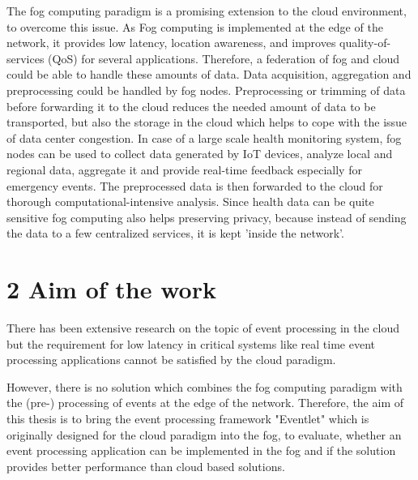 \documentclass[draft,final,openany,oneside]{vutinfth} %
\begin{document}
The fog computing paradigm is a promising extension to the cloud environment, to overcome this issue. As Fog computing is implemented at the edge of the network, it provides low latency, location awareness, and improves quality-of-services (QoS) for several applications. \cite{FogSecurityIssues}  \newline Therefore, a federation of fog and cloud could be able to handle these amounts of data. Data acquisition, aggregation and preprocessing could be handled by fog nodes. Preprocessing or trimming of data before forwarding it to the cloud reduces the needed amount of data to be transported, but also the storage in the cloud which helps to cope with the issue of data center congestion. \cite{FogComputingPrinciples} \newline
In case of a large scale health monitoring system, fog nodes can be used to collect data generated by IoT devices, analyze local and regional data, aggregate it and provide real-time feedback especially for emergency events. \newline
The preprocessed data is then forwarded to the cloud for thorough computational-intensive analysis. \cite{ASurveyOfFogComputing} Since health data can be quite sensitive fog computing also helps preserving privacy, because instead of sending the data to a few centralized services, it is kept 'inside the network'. \cite{FindingYourWay}   


\chapter{2  Aim of the work}

There has been extensive research on the topic of event processing in the cloud but the requirement for low latency in critical systems like real time event processing applications cannot be satisfied by the cloud paradigm. \cite{FogComputingPrinciples}

However,  there is no solution which combines the fog computing paradigm with the (pre-) processing of events at the edge of the network. 
Therefore, the aim of this thesis is to bring the event processing framework "Eventlet" \cite{Appel2012} which is originally designed for the cloud paradigm into the fog, to evaluate, whether an event processing application can be implemented in the fog and if the solution provides better performance than cloud based solutions. \newline
\end{document}

